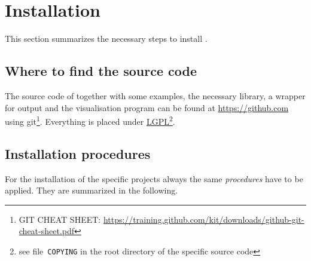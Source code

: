 \section{Installation}
This section summarizes the necessary steps to install \MBSim{}.
%
\subsection{Where to find the source code}
The source code of \MBSim{} together with some examples, the necessary \FMatVec{} library, a \HDF{} wrapper for output and the visualisation program \OpenMBV{} can be found at \url{https://github.com} using git\footnote{GIT CHEAT SHEET: \url{https://training.github.com/kit/downloads/github-git-cheat-sheet.pdf}}. Everything is placed under \href{http://www.gnu.org/licenses/lgpl.html}{LGPL}\footnote{see file~\texttt{COPYING} in the root directory of the specific source code}.\par
%
\subsection{Installation procedures}
For the installation of the specific projects always the same \emph{procedures} have to be applied. They are summarized in the following.

